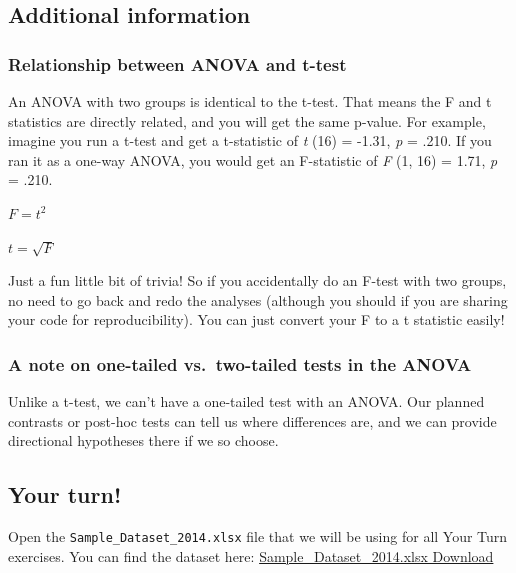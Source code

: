 \documentclass[
]{book}
\begin{document}
\hypertarget{additional-information-3}{%
\subsection{Additional information}\label{additional-information-3}}

\hypertarget{relationship-between-anova-and-t-test}{%
\subsubsection{Relationship between ANOVA and t-test}\label{relationship-between-anova-and-t-test}}

An ANOVA with two groups is identical to the t-test. That means the F and t statistics are directly related, and you will get the same p-value. For example, imagine you run a t-test and get a t-statistic of \emph{t} (16) = -1.31, \emph{p} = .210. If you ran it as a one-way ANOVA, you would get an F-statistic of \emph{F} (1, 16) = 1.71, \emph{p} = .210.

\(F = t^2\)

\(t = \sqrt{F}\)

Just a fun little bit of trivia! So if you accidentally do an F-test with two groups, no need to go back and redo the analyses (although you should if you are sharing your code for reproducibility). You can just convert your F to a t statistic easily!

\hypertarget{a-note-on-one-tailed-vs.-two-tailed-tests-in-the-anova}{%
\subsubsection{A note on one-tailed vs.~two-tailed tests in the ANOVA}\label{a-note-on-one-tailed-vs.-two-tailed-tests-in-the-anova}}

Unlike a t-test, we can't have a one-tailed test with an ANOVA. Our planned contrasts or post-hoc tests can tell us where differences are, and we can provide directional hypotheses there if we so choose.

\hypertarget{your-turn-5}{%
\subsection{Your turn!}\label{your-turn-5}}

Open the \texttt{Sample\_Dataset\_2014.xlsx} file that we will be using for all Your Turn exercises. You can find the dataset here: \href{https://github.com/danawanzer/stats-with-jamovi/blob/master/data/Sample_Dataset_2014.xlsx}{Sample\_Dataset\_2014.xlsx Download}
\end{document}
